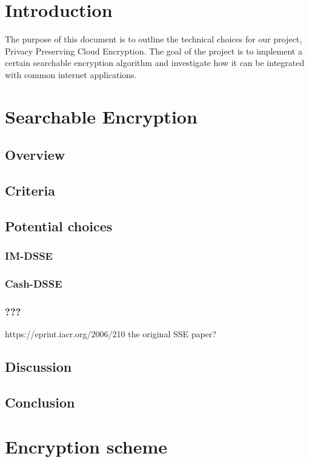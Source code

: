 \documentclass[onecolumn, draftclsnofoot,10pt, compsoc]{IEEEtran}
\begin{document}
\section{ Introduction }

The purpose of this document is to outline the technical choices for our project, Privacy Preserving Cloud Encryption. The goal of the project is to implement a certain searchable encryption algorithm and investigate how it can be integrated with common internet applications.


\section{ Searchable Encryption }

\subsection{ Overview }
\subsection{ Criteria }
\subsection{ Potential choices }
\subsubsection{ IM-DSSE }
\subsubsection{ Cash-DSSE }
\subsubsection{ ??? }
https://eprint.iacr.org/2006/210
the original SSE paper?

\subsection{ Discussion }
\subsection{ Conclusion }



\section{ Encryption scheme }
\end{document}
